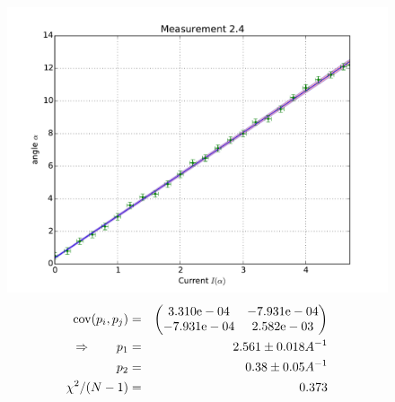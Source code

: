 \begin{figure}
    \begin{centering}
        \includegraphics[width=18cm]{figures/fig24}
\captionsetup{singlelinecheck=off} 
\caption[.]{
\begin{eqnarray*}
    \mathrm{cov}(p_i, p_j) &=& 
    \begin{pmatrix}
        3.310\mathrm{e}-04 &-7.931\mathrm{e}-04 \\
        -7.931\mathrm{e}-04 &2.582\mathrm{e}-03 \\
    \end{pmatrix}
\\ \Rightarrow \qquad
    p_1 &=& 2.561 \pm 0.018 A^{-1}\\
    p_2 &=& 0.38 \pm 0.05 A^{-1} \\
    \chi ^2/(N-1) &=&  0.373
\end{eqnarray*}
}
    \end{centering}
\end{figure}


